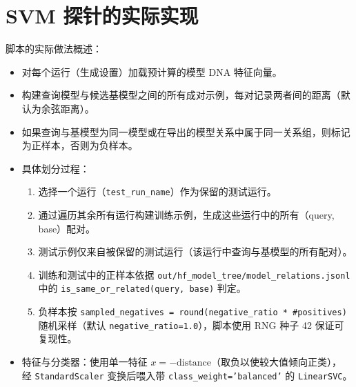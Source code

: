 \documentclass[11pt,a4paper]{article}
\begin{document}
\section{SVM 探针的实际实现}
脚本的实际做法概述：
\begin{itemize}
  \item 对每个运行（生成设置）加载预计算的模型 DNA 特征向量。
  \item 构建查询模型与候选基模型之间的所有成对示例，每对记录两者间的距离（默认为余弦距离）。
  \item 如果查询与基模型为同一模型或在导出的模型关系中属于同一关系组，则标记为正样本，否则为负样本。
  \item 具体划分过程：
    \begin{enumerate}
      \item 选择一个运行（\texttt{test\_run\_name}）作为保留的测试运行。
      \item 通过遍历其余所有运行构建训练示例，生成这些运行中的所有（query, base）配对。
      \item 测试示例仅来自被保留的测试运行（该运行中查询与基模型的所有配对）。
      \item 训练和测试中的正样本依据 \texttt{out/hf\_model\_tree/model\_relations.jsonl} 中的
        \texttt{is\_same\_or\_related(query, base)} 判定。
      \item 负样本按 \texttt{sampled\_negatives = round(negative\_ratio * \#positives)} 随机采样（默认
        \texttt{negative\_ratio=1.0}），脚本使用 RNG 种子 42 保证可复现性。
    \end{enumerate}
  \item 特征与分类器：使用单一特征 $x = -\text{distance}$（取负以使较大值倾向正类），
    经 \texttt{StandardScaler} 变换后喂入带 \texttt{class\_weight='balanced'} 的 \texttt{LinearSVC}。
\end{itemize}
\end{document}
